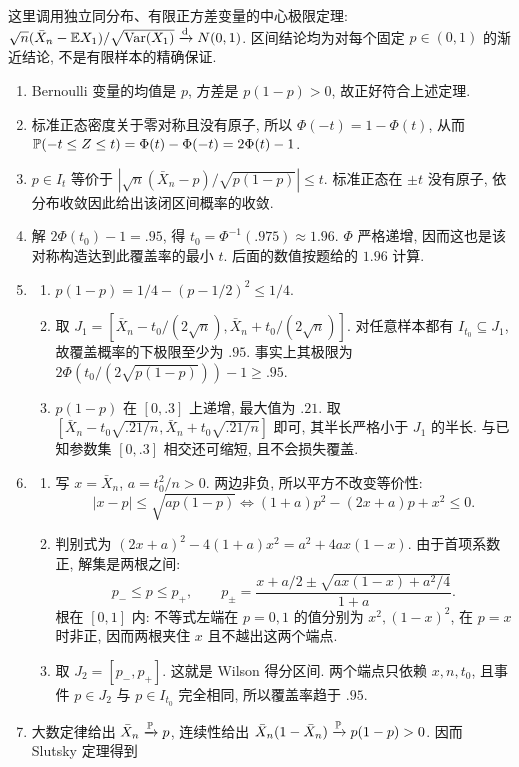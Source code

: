 \begin{solution}
这里调用独立同分布、有限正方差变量的中心极限定理: $\sqrt n(\bar X_n-\mathbb E X_1)/\sqrt{\operatorname{Var}(X_1)}\xrightarrow{\mathrm d} N(0,1)$. 区间结论均为对每个固定 $p\in(0,1)$ 的渐近结论, 不是有限样本的精确保证.
\begin{enumerate}[label=\arabic*.]
\item Bernoulli 变量的均值是 $p$, 方差是 $p(1-p)>0$, 故正好符合上述定理.
\item 标准正态密度关于零对称且没有原子, 所以 $\Phi(-t)=1-\Phi(t)$, 从而 $\mathbb P(-t\le Z\le t)=\Phi(t)-\Phi(-t)=2\Phi(t)-1$.
\item $p\in I_t$ 等价于 $|\sqrt n(\bar X_n-p)/\sqrt{p(1-p)}|\le t$. 标准正态在 $\pm t$ 没有原子, 依分布收敛因此给出该闭区间概率的收敛.
\item 解 $2\Phi(t_0)-1=.95$, 得 $t_0=\Phi^{-1}(.975)\approx1.96$. $\Phi$ 严格递增, 因而这也是该对称构造达到此覆盖率的最小 $t$. 后面的数值按题给的 $1.96$ 计算.
\item \begin{enumerate}[label=(\alph*)]
\item $p(1-p)=1/4-(p-1/2)^2\le1/4$.
\item 取 $J_1=[\bar X_n-t_0/(2\sqrt n),\bar X_n+t_0/(2\sqrt n)]$. 对任意样本都有 $I_{t_0}\subseteq J_1$, 故覆盖概率的下极限至少为 $.95$. 事实上其极限为 $2\Phi(t_0/(2\sqrt{p(1-p)}))-1\ge.95$.
\item $p(1-p)$ 在 $[0,.3]$ 上递增, 最大值为 $.21$. 取 $[\bar X_n-t_0\sqrt{.21/n},\bar X_n+t_0\sqrt{.21/n}]$ 即可, 其半长严格小于 $J_1$ 的半长. 与已知参数集 $[0,.3]$ 相交还可缩短, 且不会损失覆盖.
\end{enumerate}
\item \begin{enumerate}[label=(\alph*)]
\item 写 $x=\bar X_n$, $a=t_0^2/n>0$. 两边非负, 所以平方不改变等价性:
\[
|x-p|\le\sqrt{ap(1-p)}
\iff (1+a)p^2-(2x+a)p+x^2\le0.
\]
\item 判别式为 $(2x+a)^2-4(1+a)x^2=a^2+4ax(1-x)$. 由于首项系数正, 解集是两根之间:
\[
p_-\le p\le p_+,\qquad
p_\pm=\frac{x+a/2\pm\sqrt{ax(1-x)+a^2/4}}{1+a}.
\]
根在 $[0,1]$ 内: 不等式左端在 $p=0,1$ 的值分别为 $x^2,(1-x)^2$, 在 $p=x$ 时非正, 因而两根夹住 $x$ 且不越出这两个端点.
\item 取 $J_2=[p_-,p_+]$. 这就是 Wilson 得分区间. 两个端点只依赖 $x,n,t_0$, 且事件 $p\in J_2$ 与 $p\in I_{t_0}$ 完全相同, 所以覆盖率趋于 $.95$.
\end{enumerate}
\item 大数定律给出 $\bar X_n\xrightarrow{\mathbb P} p$, 连续性给出 $\bar X_n(1-\bar X_n)\xrightarrow{\mathbb P} p(1-p)>0$. 因而 Slutsky 定理得到

\end{enumerate}
\end{solution}
